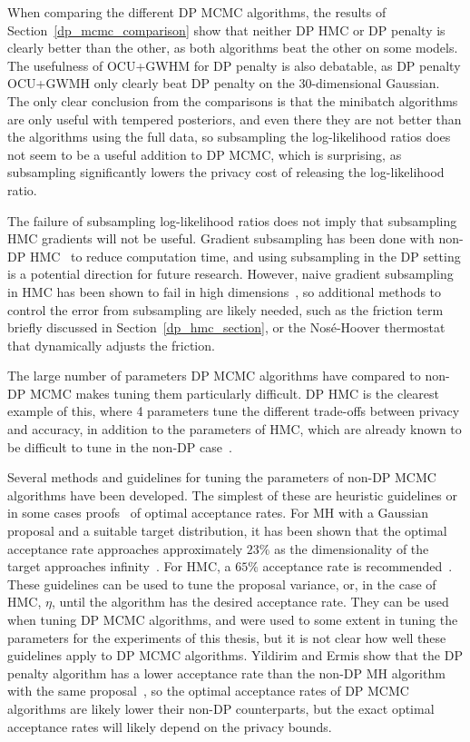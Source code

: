\documentclass[english,twoside,openright]{HYgraduMLDS}
\begin{document}
When comparing the different DP MCMC algorithms, the results of
Section~\ref{dp_mcmc_comparison} show that neither DP HMC or DP penalty is
clearly better than the other, as both algorithms beat the other on some models.
The usefulness of OCU+GWHM for DP penalty is also debatable, as DP penalty
OCU+GWMH only clearly beat DP penalty on the 30-dimensional Gaussian. The only
clear conclusion from the comparisons is that the minibatch algorithms are
only useful with tempered posteriors, and even there they are not better
than the algorithms using the full data, so subsampling the log-likelihood ratios
does not seem to be a useful addition to DP MCMC, which is surprising, as
subsampling significantly lowers the privacy cost of releasing the log-likelihood
ratio.

The failure of subsampling log-likelihood ratios does not imply that subsampling
HMC gradients will not be useful. Gradient subsampling has been done with
non-DP HMC~\cite{CFG14} to reduce computation time, and using subsampling
in the DP setting is a potential direction for future research. However,
naive gradient subsampling in HMC has been shown to fail in high
dimensions~\cite{Bet15}, so additional methods to control the error from subsampling
are likely needed, such as the friction term~\cite{CFG14} briefly discussed in
Section~\ref{dp_hmc_section}, or the Nosé-Hoover thermostat~\cite{DFB14} that
dynamically adjusts the friction.

The large number of parameters DP MCMC algorithms have compared to non-DP
MCMC makes tuning them particularly difficult. DP HMC is the clearest example
of this, where 4 parameters tune the different trade-offs between privacy and
accuracy, in addition to the parameters of HMC, which are already known to
be difficult to tune in the non-DP case~\cite{neal2012mcmc}.

Several methods and guidelines for tuning the parameters of non-DP MCMC algorithms
have been developed. The simplest of these are heuristic guidelines or in some
cases proofs~\cite{RGG97} of optimal acceptance rates. For MH with a Gaussian
proposal and a suitable target distribution, it has been shown that the optimal
acceptance rate approaches approximately \(23\%\) as the dimensionality of the
target approaches infinity~\cite{RGG97}. For HMC, a \(65\%\) acceptance rate
is recommended~\cite{neal2012mcmc}. These guidelines can be used to tune the
proposal variance,
or, in the case of HMC, \(\eta\), until the algorithm has the desired acceptance
rate. They can be used when tuning DP MCMC algorithms, and were used to some
extent in tuning the parameters for the experiments of this thesis, but it
is not clear how well these guidelines apply to DP MCMC algorithms.
Yildirim and Ermis show that the DP penalty algorithm has a lower acceptance
rate than the non-DP MH algorithm with the same proposal~\cite{YildirimE19},
so the optimal
acceptance rates of DP MCMC algorithms are likely lower their non-DP
counterparts, but the exact optimal acceptance rates will likely depend on the
privacy bounds.
\end{document}
